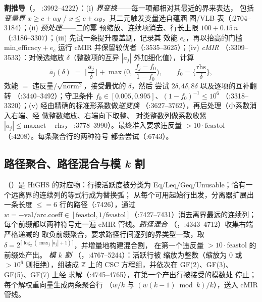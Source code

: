 \documentclass[11pt]{ctexart}
\newcommand{\Z}{\mathbb{Z}}
\begin{document}
\textbf{割推导}（，
:3992--4222）：(i) \emph{界变换}——每一项都相对其最近的界来表达，
包括\emph{变量界} $x \ge c + \alpha y$ /
$x \le c + \alpha y$，其二元触发变量选自蕴涵
图/VLB 表（:2704--3184）；(ii) \emph{预处理}——二的幂
预缩放、连续项消去、行长上限
$100 + 0.15\,n$（:3186--3307）；(iii) 先试一条提升覆盖割，记录其
效能 $e_c$，再以抬高的门槛 $\mathrm{min\_efficacy} + e_c$
运行 cMIR 并保留较优者（:3535--3625）；(iv) \emph{cMIR}
（:3309--3533）：对候选缩放 $\delta$（整数项的互异 $|a_j|$
外加细化值），计算
\begin{equation}
\bar a_j(\delta) \;=\; \Big\lfloor \frac{a_j}{\delta} \Big\rfloor
+ \max\!\Big(0,\ \frac{f_j - f_0}{1 - f_0}\Big),\qquad
f_0 = \Big\{\frac{\mathrm{rhs}}{\delta}\Big\},
\label{eq:cmir}
\end{equation}
效能 $=$ 违反量$/\sqrt{\mathrm{norm}^2}$，接受最优的 $\delta$，然后
尝试 $2\delta, 4\delta, 8\delta$ 以及逐项的互补翻转
（:3440--3492）；守卫条件 $f_0 \in [0.005, 0.995]$、$(1-f_0)^{-1} \le 10^6$
（:3318--3320）；(v) 经由精确的标准形系数做\emph{逆变换}
（:3627--3762），再后处理（小系数消入右端、经
 做整数缩放、右端向下取整、
对类整数列做系数收紧 $|a_j| \le \mathrm{maxact} - \mathrm{rhs}$，
:3778--3990）。最终准入要求违反量
$> 10\cdot\mathrm{feastol}$（:4208）。每条聚合行的两种符号
都会尝试（:6743）。

\subsection{路径聚合、路径混合与模 \emph{k} 割}
（）是
HiGHS  的对应物：行按活跃度被分类为
Eq/Leq/Geq/Unusable；恰有一个远离界的连续列的等式行成为替换弧；
从每个可用起始行出发，分离器扩展出一条长度
$\le$$=6$ 行的路径（:7426），通过
$w = -\mathrm{val}/\mathrm{arc.coeff} \in [\mathrm{feastol},
1/\mathrm{feastol}]$（:7427--7431）消去离界最远的连续列；
每个前缀都以两种符号走一遍 cMIR 管线。\emph{路径混合}
（，:4343--4712）收集右端严格递减的
取负前缀聚合，要求路径行间逐列的界类型一致，取
$\delta = 2^{\lceil \log_2(\max_j |a_j| + 1)\rceil}$，并增量地构建混合割，
在第一个违反量 $> 10\cdot\mathrm{feastol}$ 的前缀处产出。
\emph{模 $k$ 割}
（，:4767--5244）：活跃行被
缩放为整数（缩放为 $0$ 或 $>10^6$ 则拒绝），组装成 $\Z$ 上的
CSC 方程组，并依次在 GF(2)、GF(3)、GF(5)、GF(7) 上经
 求解（:4745--4765），在第一个产出行被接受的模数处
停止；每个解权重向量生成两条聚合行
（$w/k$ 与 $(w(k-1)\bmod k)/k$），送入 cMIR 管线。
\end{document}
